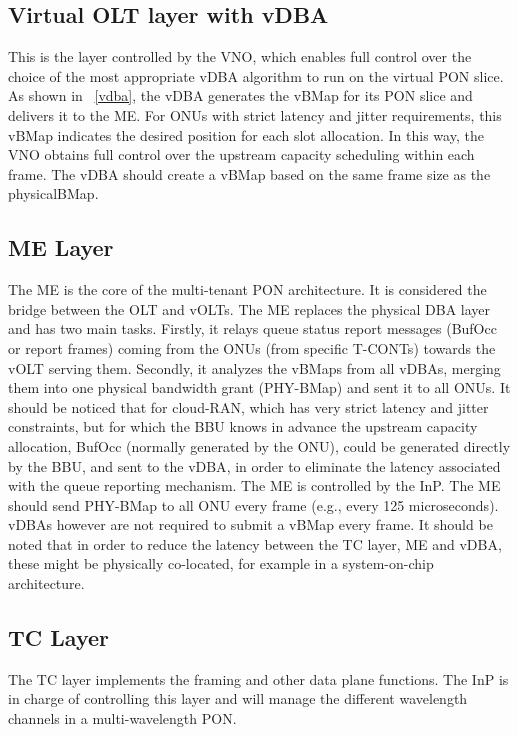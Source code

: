 \subsection{Virtual \ac{OLT} layer with \ac{vDBA}}
This is the layer controlled by the \ac{VNO}, which enables full control over the choice of the most appropriate \ac{vDBA} algorithm to run on the virtual \ac{PON} slice. As shown in \figureautorefname~\ref{vdba}, the \ac{vDBA} generates the \ac{vBMap} for its \ac{PON} slice and delivers it to the \ac{ME}. For \acp{ONU} with strict latency and jitter requirements, this \ac{vBMap} indicates the desired position for each slot allocation. In this way, the \ac{VNO} obtains full control over the upstream capacity scheduling within each frame. The \ac{vDBA} should create a \ac{vBMap} based on the same frame size as the physical\ac{BMap}.


\subsection{\acf{ME} Layer}
The \ac{ME} is the core of the multi-tenant \ac{PON} architecture. It is considered the bridge between the \ac{OLT} and \acp{vOLT}. The \ac{ME} replaces the physical \ac{DBA} layer and has two main tasks. Firstly, it relays queue status report messages (BufOcc or report frames) coming from the \acp{ONU} (from specific \acp{T-CONT}) towards the \ac{vOLT} serving them. Secondly, it analyzes the \acp{vBMap} from all \acp{vDBA}, merging them into one physical bandwidth grant (PHY-\ac{BMap}) and sent it to all \acp{ONU}. It should be noticed that for cloud-RAN, which has very strict latency and jitter constraints, but for which the \ac{BBU} knows in advance the upstream capacity allocation, BufOcc (normally generated by the \ac{ONU}), could be generated directly by the \ac{BBU}, and sent to the \ac{vDBA}, in order to eliminate the latency associated with the queue reporting mechanism. The \ac{ME} is controlled by the \ac{InP}. The \ac{ME} should send PHY-\ac{BMap} to all \ac{ONU} every frame (e.g., every 125 microseconds). \acp{vDBA} however are not required to submit a \ac{vBMap} every frame. It should be noted that in order to reduce the latency between the \ac{TC} layer, \ac{ME} and \ac{vDBA}, these might be physically co-located, for example in a system-on-chip architecture.


\subsection{\acf{TC} Layer} 
The \ac{TC} layer implements the framing and other data plane functions. The \ac{InP} is in charge of controlling this layer and will manage the different wavelength channels in a multi-wavelength \ac{PON}. 



